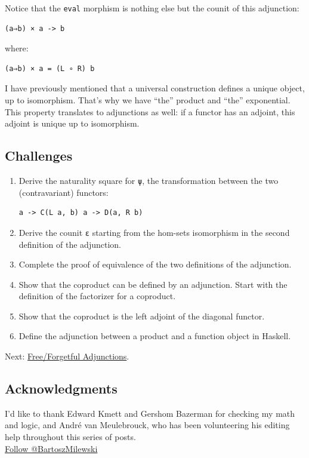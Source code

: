 Notice that the \texttt{eval} morphism is nothing else but the counit of
this adjunction:

\begin{verbatim}
(a⇒b) × a -> b
\end{verbatim}

where:

\begin{verbatim}
(a⇒b) × a = (L ∘ R) b
\end{verbatim}

I have previously mentioned that a universal construction defines a
unique object, up to isomorphism. That's why we have ``the'' product and
``the'' exponential. This property translates to adjunctions as well: if
a functor has an adjoint, this adjoint is unique up to isomorphism.

\subsection{Challenges}\label{challenges}

\begin{enumerate}
\item
  Derive the naturality square for \texttt{ψ}, the transformation
  between the two (contravariant) functors:

\begin{verbatim}
a -> C(L a, b) a -> D(a, R b)
\end{verbatim}
\item
  Derive the counit \texttt{ε} starting from the hom-sets isomorphism in
  the second definition of the adjunction.
\item
  Complete the proof of equivalence of the two definitions of the
  adjunction.
\item
  Show that the coproduct can be defined by an adjunction. Start with
  the definition of the factorizer for a coproduct.
\item
  Show that the coproduct is the left adjoint of the diagonal functor.
\item
  Define the adjunction between a product and a function object in
  Haskell.
\end{enumerate}

Next:
\href{https://bartoszmilewski.com/2016/06/15/freeforgetful-adjunctions/}{Free/Forgetful
Adjunctions}.

\subsection{Acknowledgments}\label{acknowledgments}

I'd like to thank Edward Kmett and Gershom Bazerman for checking my math
and logic, and André van Meulebrouck, who has been volunteering his
editing help throughout this series of posts.\\
\href{https://twitter.com/BartoszMilewski}{Follow @BartoszMilewski}

